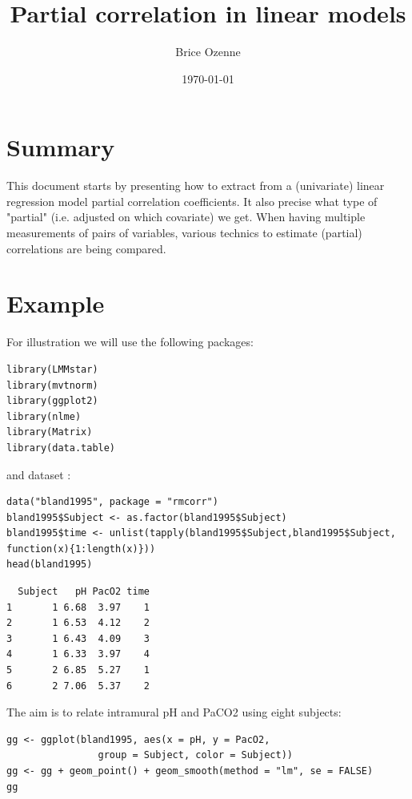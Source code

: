 \documentclass[12pt]{article}
\author{Brice Ozenne}
\date{\today}
\title{Partial correlation in linear models}
\begin{document}
\maketitle

\section{Summary}
\label{sec:org0de5a22}

This document starts by presenting how to extract from a (univariate)
linear regression model partial correlation coefficients. It also
precise what type of "partial" (i.e. adjusted on which covariate) we
get. When having multiple measurements of pairs of variables, various
technics to estimate (partial) correlations are being compared.

\section{Example}
\label{sec:org7bd2597}

For illustration we will use the following packages:
\lstset{language=r,label= ,caption= ,captionpos=b,numbers=none}
\begin{lstlisting}
library(LMMstar)
library(mvtnorm)
library(ggplot2)
library(nlme)
library(Matrix)
library(data.table)
\end{lstlisting}

and dataset \citep{bland1995calculating}:
\lstset{language=r,label= ,caption= ,captionpos=b,numbers=none}
\begin{lstlisting}
data("bland1995", package = "rmcorr")
bland1995$Subject <- as.factor(bland1995$Subject)
bland1995$time <- unlist(tapply(bland1995$Subject,bland1995$Subject, function(x){1:length(x)}))
head(bland1995)
\end{lstlisting}

\begin{verbatim}
  Subject   pH PacO2 time
1       1 6.68  3.97    1
2       1 6.53  4.12    2
3       1 6.43  4.09    3
4       1 6.33  3.97    4
5       2 6.85  5.27    1
6       2 7.06  5.37    2
\end{verbatim}


\clearpage

The aim is to relate intramural pH and PaCO2 using eight subjects:

\lstset{language=r,label= ,caption= ,captionpos=b,numbers=none}
\begin{lstlisting}
gg <- ggplot(bland1995, aes(x = pH, y = PacO2,
			    group = Subject, color = Subject))
gg <- gg + geom_point() + geom_smooth(method = "lm", se = FALSE)
gg
\end{lstlisting}
\end{document}

